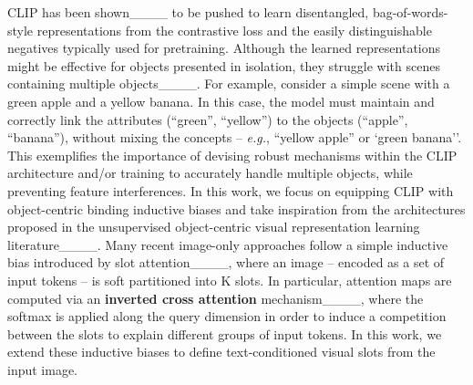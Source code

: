 CLIP has been shown____ to be pushed to learn disentangled, bag-of-words-style representations from the contrastive loss and the easily distinguishable negatives typically used for pretraining. Although the learned representations might be effective for objects presented in isolation, they struggle with scenes containing multiple objects____. For example, consider a simple scene with a green apple and a yellow banana. In this case, the model must maintain and correctly link the attributes (``green'', ``yellow'') to the objects (``apple'', ``banana''), without mixing the concepts  -- \textit{e.g.}, ``yellow apple'' or `green banana''. This exemplifies the importance of devising robust mechanisms within the CLIP architecture and/or training to accurately handle multiple objects, while preventing feature interferences. 
In this work, we focus on equipping CLIP with object-centric binding inductive biases and take inspiration from the architectures proposed in the unsupervised object-centric visual representation learning literature____. Many recent image-only approaches follow a simple inductive bias introduced by slot attention____, where  an image -- encoded as a set of input tokens -- is soft partitioned into
K slots. In particular, attention maps are computed via an \textbf{inverted cross attention} mechanism____, where the softmax is applied along the query dimension in order to induce a competition between the slots to explain different groups of input tokens. In this work, we extend these inductive biases to define text-conditioned visual slots from the input image.